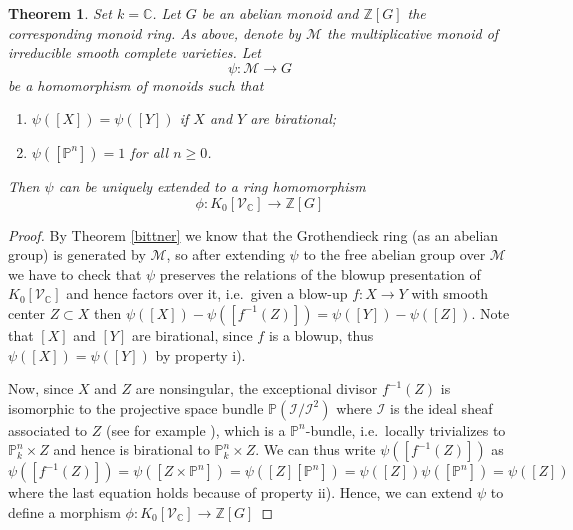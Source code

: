 \documentclass[11pt, a4paper, german]{article}
\theoremstyle{plain}
\newtheorem{theorem}{Theorem}[section]
\theoremstyle{definition}
\newcommand{\gring}[1][k]{K_0[\mathcal{V}_#1]}
\begin{document}
\begin{theorem}
    \label{th1}
    Set $k = \mathbb{C}$. Let $G$ be an abelian monoid and $\mathbb{Z}[G]$ the corresponding monoid ring. As above, denote
    by $\mathcal{M}$ the multiplicative monoid of irreducible smooth complete varieties. Let
    \[
        \psi \colon \mathcal{M} \to G
    \]
    be a homomorphism of monoids such that
    \begin{enumerate}[label=\rm{\roman*)}]
        \item $\psi([X]) = \psi([Y])$ if $X$ and $Y$ are birational;
        \item $\psi([\mathbb{P}^n]) = 1$ for all $n \ge 0$.
    \end{enumerate}
    Then $\psi$ can be uniquely extended to a ring homomorphism 
    \[
        \phi \colon \gring[\mathbb{C}] \to \mathbb{Z} [G]
    \]
\end{theorem}

\begin{proof}
    By Theorem \ref{bittner} we know that the Grothendieck ring (as an abelian group) is generated by $\mathcal{M}$, so after extending $\psi$ to
    the free abelian group over $\mathcal{M}$ 
    we have to check that $\psi$ preserves the relations of the blowup presentation of $\gring[\mathbb{C}]$ and hence factors over it,
    i.e.\ given a blow-up $f \colon X \to Y$ with smooth center $Z \subset X$ then $\psi([X]) - \psi([f^{-1}(Z)]) = \psi([Y]) - \psi([Z])$. 
    Note that $[X]$ and $[Y]$ are birational, since $f$ is a blowup, thus $\psi([X]) = \psi([Y])$ by property i).
    
    Now, since $X$ and $Z$ are nonsingular, the exceptional divisor $f^{-1}(Z)$ is isomorphic to 
    the projective space bundle  $\mathbb{P}(\mathcal{I}/\mathcal{I}^2)$ 
    where $\mathcal{I}$ is the ideal sheaf associated to $Z$ (see for example \cite[II.8, Thm 8.24]{Ha}),
    which is a $\mathbb{P}^n$-bundle, i.e.\ locally trivializes to $\mathbb{P}_k^n \times Z$
    and hence is birational to $\mathbb{P}_k^n \times Z$. 
    We can thus write $\psi([f^{-1}(Z)])$ as  
    \[
        \psi([f^{-1}(Z)]) = \psi([Z \times \mathbb{P}^n]) = \psi([Z][\mathbb{P}^n]) = \psi([Z])\psi([\mathbb{P}^n]) = \psi([Z])
    \]
    where the last equation holds because of property ii).
    Hence, we can extend $\psi$ to define a morphism $\phi \colon \gring[\mathbb{C}] \to \mathbb{Z} [G]$
\end{proof}
\end{document}
